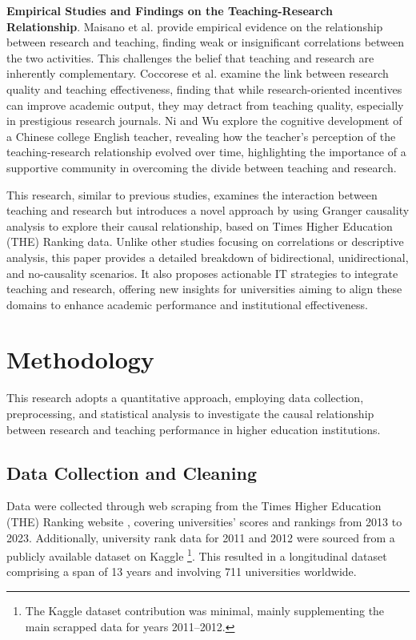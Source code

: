 \documentclass[conference]{IEEEtran}
\begin{document}
\textbf{Empirical Studies and Findings on the Teaching-Research Relationship}. Maisano et al. \cite{maisano2023empirical} provide empirical evidence on the relationship between research and teaching, finding weak or insignificant correlations between the two activities. This challenges the belief that teaching and research are inherently complementary. Coccorese et al. \cite{Coccorese2024} examine the link between research quality and teaching effectiveness, finding that while research-oriented incentives can improve academic output, they may detract from teaching quality, especially in prestigious research journals. Ni and Wu \cite{ni2023research} explore the cognitive development of a Chinese college English teacher, revealing how the teacher’s perception of the teaching-research relationship evolved over time, highlighting the importance of a supportive community in overcoming the divide between teaching and research.  

This research, similar to previous studies, examines the interaction between teaching and research but introduces a novel approach by using Granger causality analysis to explore their causal relationship, based on Times Higher Education (THE) Ranking data. Unlike other studies focusing on correlations or descriptive analysis, this paper provides a detailed breakdown of bidirectional, unidirectional, and no-causality scenarios. It also proposes actionable IT strategies to integrate teaching and research, offering new insights for universities aiming to align these domains to enhance academic performance and institutional effectiveness.  

\section{Methodology}
\label{sec:methodology}

This research adopts a quantitative approach, employing data collection, preprocessing, and statistical analysis to investigate the causal relationship between research and teaching performance in higher education institutions.

\subsection{Data Collection and Cleaning}

Data were collected through web scraping from the Times Higher Education (THE) Ranking website \cite{the2024}, covering universities' scores and rankings from 2013 to 2023. Additionally, university rank data for 2011 and 2012 were sourced from a publicly available dataset on Kaggle \cite{ONeil_2020}\footnote{The Kaggle dataset contribution was minimal, mainly supplementing the main scrapped data for years 2011--2012.}. This resulted in a longitudinal dataset comprising a span of 13 years and involving 711 universities worldwide.
\end{document}
